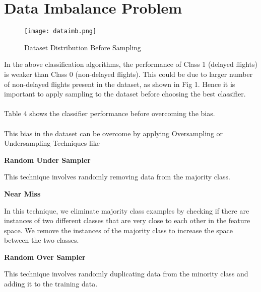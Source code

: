 \documentclass[12pt,letter-paper]{article}
\begin{document}
    
\section{Data Imbalance Problem}        

    \begin{figure}[H]%
        \begin{center}
          \texttt{[image: dataimb.png]}%
            \caption{Dataset Distribution Before Sampling}  
        \end{center}
    \end{figure}
    
    In the above classification algorithms, the performance of Class 1 (delayed flights) is weaker than Class 0 (non-delayed flights). This could be due to larger number of non-delayed flights present in the dataset, as shown in Fig 1. Hence it is important to apply sampling to the dataset before choosing the best classifier. 
    
    \paragraph{}
    Table 4 shows the classifier performance before overcoming the bias.
    
    \paragraph{}
        This bias in the dataset can be overcome by applying Oversampling or Undersampling Techniques like
        \item\textbf{Random Under Sampler}
            
            This technique involves randomly removing data from the majority class.
            
        \item\textbf{Near Miss}
            
            In this technique, we eliminate majority class examples by checking if there are instances of two different classes that are very close to each other in the feature space. We remove the instances of the majority class to increase the space between the two classes.  
            
        \item\textbf{Random Over Sampler}
            
            This technique involves randomly duplicating data from the minority class and adding it to the training data.
        
\end{document}

